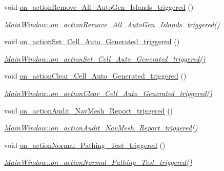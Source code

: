 \begin{DoxyCompactItemize}
void \hyperlink{class_main_window_a184ce07aa200770c9862a049694e0ef0}{on\+\_\+action\+Remove\+\_\+\+All\+\_\+\+Auto\+Gen\+\_\+\+Islands\+\_\+triggered} ()
\begin{DoxyCompactList}\small\item\em \hyperlink{class_main_window_a184ce07aa200770c9862a049694e0ef0}{Main\+Window\+::on\+\_\+action\+Remove\+\_\+\+All\+\_\+\+Auto\+Gen\+\_\+\+Islands\+\_\+triggered()} \end{DoxyCompactList}\item 
void \hyperlink{class_main_window_ae5dd5f28e8bbe2be6d69d8b4d05b0310}{on\+\_\+action\+Set\+\_\+\+Cell\+\_\+\+Auto\+\_\+\+Generated\+\_\+triggered} ()
\begin{DoxyCompactList}\small\item\em \hyperlink{class_main_window_ae5dd5f28e8bbe2be6d69d8b4d05b0310}{Main\+Window\+::on\+\_\+action\+Set\+\_\+\+Cell\+\_\+\+Auto\+\_\+\+Generated\+\_\+triggered()} \end{DoxyCompactList}\item 
void \hyperlink{class_main_window_a563c87486ad750b682d6e1f200484d68}{on\+\_\+action\+Clear\+\_\+\+Cell\+\_\+\+Auto\+\_\+\+Generated\+\_\+triggered} ()
\begin{DoxyCompactList}\small\item\em \hyperlink{class_main_window_a563c87486ad750b682d6e1f200484d68}{Main\+Window\+::on\+\_\+action\+Clear\+\_\+\+Cell\+\_\+\+Auto\+\_\+\+Generated\+\_\+triggered()} \end{DoxyCompactList}\item 
void \hyperlink{class_main_window_a6baa49b83387847510b49f0e93e0a508}{on\+\_\+action\+Audit\+\_\+\+Nav\+Mesh\+\_\+\+Report\+\_\+triggered} ()
\begin{DoxyCompactList}\small\item\em \hyperlink{class_main_window_a6baa49b83387847510b49f0e93e0a508}{Main\+Window\+::on\+\_\+action\+Audit\+\_\+\+Nav\+Mesh\+\_\+\+Report\+\_\+triggered()} \end{DoxyCompactList}\item 
void \hyperlink{class_main_window_ac03caa5d16c087e2d4fab3cc09c44363}{on\+\_\+action\+Normal\+\_\+\+Pathing\+\_\+\+Test\+\_\+triggered} ()
\begin{DoxyCompactList}\small\item\em \hyperlink{class_main_window_ac03caa5d16c087e2d4fab3cc09c44363}{Main\+Window\+::on\+\_\+action\+Normal\+\_\+\+Pathing\+\_\+\+Test\+\_\+triggered()} \end{DoxyCompactList}\item 

\end{DoxyCompactItemize}
